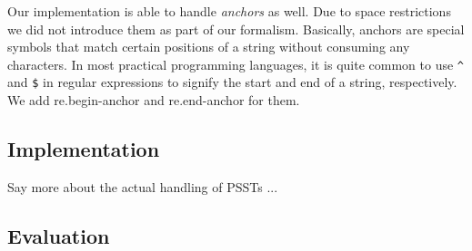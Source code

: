 Our implementation is able to handle \textit{anchors} as well. Due to space restrictions we did not introduce them as part of our formalism. Basically, anchors are special symbols that match certain positions of a string without consuming any characters. In most practical programming languages, it is quite common to use \verb!^! and \verb!$! in regular expressions to signify the start and end of a string, respectively. We add \textsf{re.begin-anchor} and \textsf{re.end-anchor} for them.

\subsection{Implementation}

Say more about the actual handling of PSSTs ...

\subsection{Evaluation}

